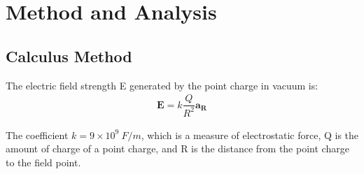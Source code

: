 \documentclass[journal,twocolumn,letterpaper]{IEEEJERM}
\begin{document}
%



\section{Method and Analysis}
\subsection{Calculus Method}
The electric field strength E generated by the point charge in vacuum is:
\begin{align}
\mathbf{E}=k\dfrac{Q}{R^2}\mathbf{a_R}
\end{align}

The coefficient $k=9\times10^9\ F/m$, which is a measure of electrostatic force, Q is the amount of charge of a point charge, and R is the distance from the point charge to the field point.
\end{document}
